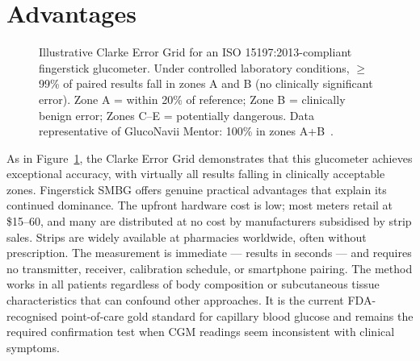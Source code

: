 \section{Advantages}

\begin{figure}[H]
\centering
{}
\caption{Illustrative Clarke Error Grid for an ISO 15197:2013-compliant fingerstick glucometer. Under controlled laboratory conditions, $\geq$99\% of paired results fall in zones A and B (no clinically significant error). Zone A = within 20\% of reference; Zone B = clinically benign error; Zones C--E = potentially dangerous. Data representative of GlucoNavii Mentor: 100\% in zones A+B~\cite{gluconavii2022}.}
\label{fig:fingerstick_ceg}
\end{figure}

As in Figure~\ref{fig:fingerstick_ceg}, the Clarke Error Grid demonstrates that this glucometer achieves exceptional accuracy, with virtually all results falling in clinically acceptable zones. Fingerstick SMBG offers genuine practical advantages that explain its continued dominance. The upfront hardware cost is low; most meters retail at \$15--60, and many are distributed at no cost by manufacturers subsidised by strip sales. Strips are widely available at pharmacies worldwide, often without prescription. The measurement is immediate --- results in seconds --- and requires no transmitter, receiver, calibration schedule, or smartphone pairing. The method works in all patients regardless of body composition or subcutaneous tissue characteristics that can confound other approaches. It is the current FDA-recognised point-of-care gold standard for capillary blood glucose and remains the required confirmation test when CGM readings seem inconsistent with clinical symptoms.

